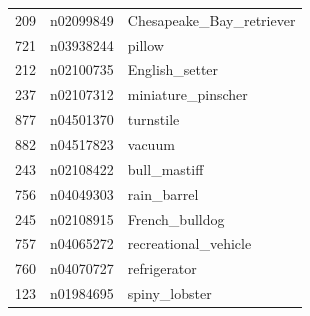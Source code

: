 \begin{table}
\begin{tabular}{cll}
209 & n02099849 & Chesapeake_Bay_retriever \\
721 & n03938244 & pillow \\
212 & n02100735 & English_setter \\
237 & n02107312 & miniature_pinscher \\
877 & n04501370 & turnstile \\
882 & n04517823 & vacuum \\
243 & n02108422 & bull_mastiff \\
756 & n04049303 & rain_barrel \\
245 & n02108915 & French_bulldog \\
757 & n04065272 & recreational_vehicle \\
760 & n04070727 & refrigerator \\
123 & n01984695 & spiny_lobster \\
\bottomrule
\end{tabular}
\end{table}
